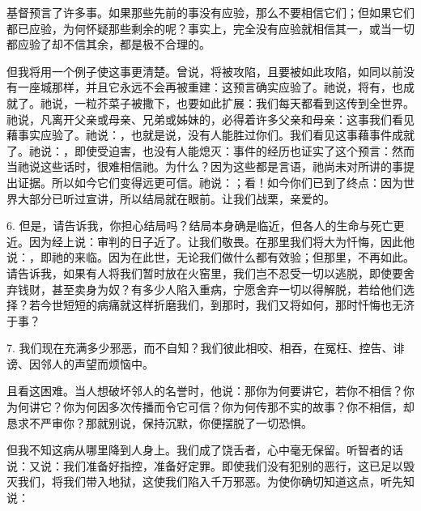 基督预言了许多事。如果那些先前的事没有应验，那么不要相信它们；但如果它们都已应验，为何怀疑那些剩余的呢？事实上，完全没有应验就相信其一，或当一切都应验了却不信其余，都是极不合理的。\par

但我将用一个例子使这事更清楚。曾说，将被攻陷，且要被如此攻陷，如同以前没有一座城那样，并且它永远不会再被重建：这预言确实应验了。祂说，将有，也成就了。祂说，一粒芥菜子被撒下，也要如此扩展：我们每天都看到这传到全世界。祂说，凡离开父亲或母亲、兄弟或姊妹的，必得着许多父亲和母亲：这事我们看见藉事实应验了。祂说：，也就是说，没有人能胜过你们。我们看见这事藉事件成就了。祂说：，即使受迫害，也没有人能熄灭：事件的经历也证实了这个预言：然而当祂说这些话时，很难相信祂。为什么？因为这些都是言语，祂尚未对所讲的事提出证据。所以如今它们变得远更可信。祂说：；看！如今你们已到了终点：因为世界大部分已听过宣讲，所以结局就在眼前。让我们战栗，亲爱的。\par

6. 但是，请告诉我，你担心结局吗？结局本身确是临近，但各人的生命与死亡更近。因为经上说：审判的日子近了。让我们敬畏。在那里我们将大为忏悔，因此他说：，即祂的来临。因为在此世，无论我们做什么都有效验；但那里，不再如此。请告诉我，如果有人将我们暂时放在火窑里，我们岂不忍受一切以逃脱，即使要舍弃钱财，甚至卖身为奴？有多少人陷入重病，宁愿舍弃一切以得解脱，若给他们选择？若今世短短的病痛就这样折磨我们，到那时，我们又将如何，那时忏悔也无济于事？\par

7. 我们现在充满多少邪恶，而不自知？我们彼此相咬、相吞，在冤枉、控告、诽谤、因邻人的声望而烦恼中。\par

且看这困难。当人想破坏邻人的名誉时，他说：那你为何要讲它，若你不相信？你为何讲它？你为何因多次传播而令它可信？你为何传那不实的故事？你不相信，却恳求不严审你？那就别说，保持沉默，你便摆脱了一切恐惧。\par

但我不知这病从哪里降到人身上。我们成了饶舌者，心中毫无保留。听智者的话说：又说：我们准备好指控，准备好定罪。即使我们没有犯别的恶行，这已足以毁灭我们，将我们带入地狱，这使我们陷入千万邪恶。为使你确切知道这点，听先知说：\par

